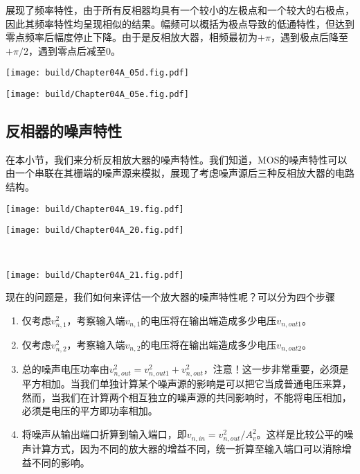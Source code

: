 展现了频率特性，由于所有反相器均具有一个较小的左极点和一个较大的右极点，因此其频率特性均呈现相似的结果。幅频可以概括为极点导致的低通特性，但达到零点频率后幅度停止下降。由于是反相放大器，相频最初为$+\pi$，遇到极点后降至$+\pi/2$，遇到零点后减至$0$。

\begin{Figure}[反相放大器的频率特性]
    \begin{FigureSub}[幅率特性]
        \texttt{[image: build/Chapter04A\_05d.fig.pdf]}
    \end{FigureSub}
    \begin{FigureSub}[相率特性]
        \texttt{[image: build/Chapter04A\_05e.fig.pdf]}
    \end{FigureSub}
\end{Figure}

\subsection{反相器的噪声特性}
在本小节，我们来分析反相放大器的噪声特性。我们知道，MOS的噪声特性可以由一个串联在其栅端的噪声源来模拟，展现了考虑噪声源后三种反相放大器的电路结构。
\begin{Figure}[反相放大器的噪声]
    \begin{FigureSub}
        \texttt{[image: build/Chapter04A\_19.fig.pdf]}
    \end{FigureSub}\qquad
    \begin{FigureSub}
        \texttt{[image: build/Chapter04A\_20.fig.pdf]}
    \end{FigureSub}\\ \vspace{0.25cm}
    \begin{FigureSub}
        \texttt{[image: build/Chapter04A\_21.fig.pdf]}
    \end{FigureSub}
\end{Figure}

现在的问题是，我们如何来评估一个放大器的噪声特性呢？可以分为四个步骤
\begin{enumerate}
    \item 仅考虑$v_{n,1}^2$，考察输入端$v_{n,1}$的电压将在输出端造成多少电压$v_{n,out1}$。
    \item 仅考虑$v_{n,2}^2$，考察输入端$v_{n,2}$的电压将在输出端造成多少电压$v_{n,out2}$。
    \item 总的噪声电压功率由$v_{n,out}^2=v_{n,out1}^2+v_{n,out}^2$，注意！这一步非常重要，必须是平方相加。当我们单独计算某个噪声源的影响是可以把它当成普通电压来算，然而，当我们在计算两个相互独立的噪声源的共同影响时，不能将电压相加，必须是电压的平方即功率相加。
    \item 将噪声从输出端口折算到输入端口，即$v_{n,in}=v_{n,out}^2/A_v^2$。这样是比较公平的噪声计算方式，因为不同的放大器的增益不同，统一折算至输入端口可以消除增益不同的影响。
\end{enumerate}

